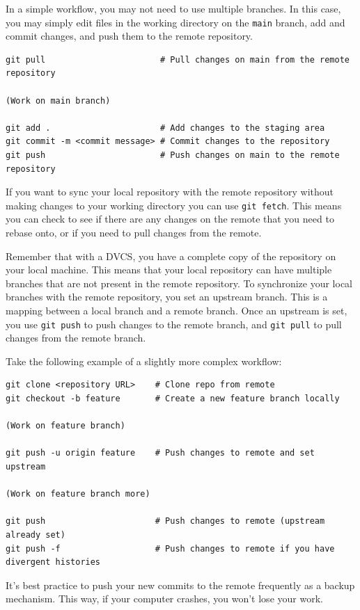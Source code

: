 \documentclass[fleqn]{article}
\begin{document}
In a simple workflow, you may not need to use multiple branches. In this case,
you may simply edit files in the working directory on the \texttt{main} branch,
add and commit changes, and push them to the remote repository.

\begin{lstlisting}
git pull                       # Pull changes on main from the remote repository

(Work on main branch)

git add .                      # Add changes to the staging area
git commit -m <commit message> # Commit changes to the repository
git push                       # Push changes on main to the remote repository
\end{lstlisting}

If you want to sync your local repository with the remote repository without
making changes to your working directory you can use \texttt{git fetch}. This
means you can check to see if there are any changes on the remote that you need
to rebase onto, or if you need to pull changes from the remote.

Remember that with a DVCS, you have a complete copy of the repository on your
local machine. This means that your local repository can have multiple branches
that are not present in the remote repository. To synchronize your local
branches with the remote repository, you set an upstream branch.
This is a mapping between a local branch and a remote branch. Once an
upstream is set, you use \texttt{git push} to push changes to the remote
branch, and \texttt{git pull} to pull changes from the remote branch.

Take the following example of a slightly more complex workflow:

\begin{lstlisting}
git clone <repository URL>    # Clone repo from remote
git checkout -b feature       # Create a new feature branch locally

(Work on feature branch)

git push -u origin feature    # Push changes to remote and set upstream

(Work on feature branch more)

git push                      # Push changes to remote (upstream already set)
git push -f                   # Push changes to remote if you have divergent histories
\end{lstlisting}

It's best practice to push your new commits to the remote frequently as a 
backup mechanism. This way, if your computer crashes, you won't lose your work.
\end{document}
